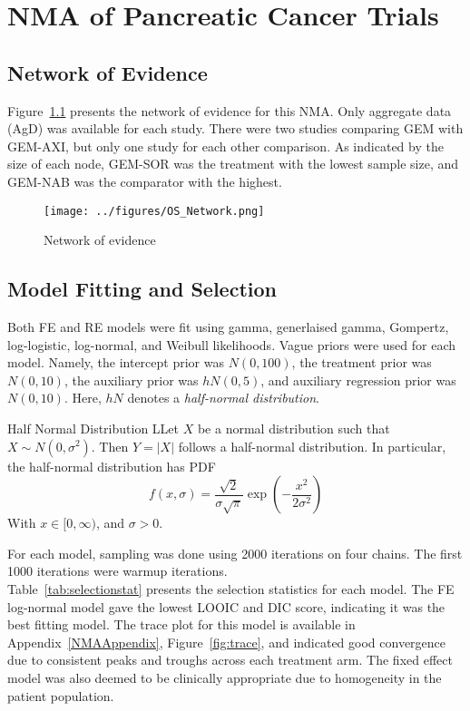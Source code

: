 \chapter{NMA of Pancreatic Cancer Trials}

\section{Network of Evidence}
Figure~\ref{fig:osnet} presents the network of evidence for this NMA. Only aggregate data (AgD) was available for each study. There were two studies comparing GEM with GEM-AXI, but only one study for each other comparison. As indicated by the size of each node, GEM-SOR was the treatment with the lowest sample size, and GEM-NAB was the comparator with the highest.

\begin{figure}[h]
    \centering
    \texttt{[image: ../figures/OS\_Network.png]}
    \caption{Network of evidence}
    \label{fig:osnet}
\end{figure}

\section{Model Fitting and Selection}
Both FE and RE models were fit using gamma, generlaised gamma, Gompertz, log-logistic, log-normal, and Weibull likelihoods. Vague priors were used for each model. Namely, the intercept prior was $N(0, 100)$, the treatment prior was $N(0, 10)$, the auxiliary prior was $hN(0, 5)$, and auxiliary regression prior was $N(0, 10)$. Here, $hN$ denotes a \textit{half-normal distribution}.

\begin{definition}{Half Normal Distribution}
    LLet $X$ be a normal distribution such that $X \sim N(0, \sigma^2)$. Then $Y = |X|$ follows a half-normal distribution. In particular, the half-normal distribution has PDF 
    \[
        f(x, \sigma) = \frac{\sqrt{2}}{\sigma \sqrt{\pi}}\exp \left(-\frac{x^2}{2\sigma^2}\right)    
    \]
    With $x \in [0, \infty)$, and $\sigma > 0$.
\end{definition}

For each model, sampling was done using 2000 iterations on four chains. The first 1000 iterations were warmup iterations. \\

Table~\ref{tab:selectionstat} presents the selection statistics for each model. The FE log-normal model gave the lowest LOOIC and DIC score, indicating it was the best fitting model. The trace plot for this model is available in Appendix~\ref{NMAAppendix}, Figure~\ref{fig:trace}, and indicated good convergence due to consistent peaks and troughs across each treatment arm. The fixed effect model was also deemed to be clinically appropriate due to homogeneity in the patient population. 

